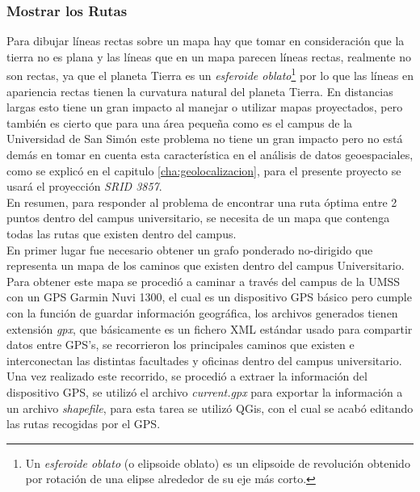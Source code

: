 \subsubsection{Mostrar los Rutas}
\label{sub:Mostrar los Rutas}

Para dibujar líneas rectas sobre un mapa hay que tomar en consideración que la tierra no es plana y las líneas que en un mapa parecen líneas rectas, realmente no son rectas, ya que el planeta Tierra es un \emph{esferoide oblato}\footnote{Un \emph{esferoide oblato} (o elipsoide oblato) es un elipsoide de revolución obtenido por rotación de una elipse alrededor de su eje más corto.} por lo que las líneas en apariencia rectas tienen la curvatura natural del planeta Tierra. En distancias largas esto tiene un gran impacto al manejar o utilizar mapas proyectados, pero también es cierto que para una área pequeña como es el campus de la Universidad de San Simón este problema no tiene un gran impacto pero no está demás en tomar en cuenta esta característica en el análisis de datos geoespaciales, como se explicó en el capitulo \ref{cha:geolocalizacion}, para el presente proyecto se usará el proyección \emph{SRID 3857}.\\



En resumen, para responder al problema de encontrar una ruta óptima entre 2 puntos dentro del campus universitario, se necesita de un mapa que contenga todas las rutas que existen dentro del campus.\\


 En primer lugar fue necesario obtener un grafo ponderado no-dirigido que representa un mapa de los caminos que existen dentro del campus Universitario.\\

 Para obtener este mapa se procedió a caminar a través del campus de la UMSS con un GPS Garmin Nuvi 1300, el cual es un dispositivo GPS básico pero cumple con la función de guardar información geográfica, los archivos generados tienen extensión \emph{gpx}, que básicamente es un fichero XML estándar usado para compartir datos entre GPS's, se recorrieron los principales caminos que existen e interconectan las distintas facultades y oficinas dentro del campus universitario. Una vez realizado este recorrido, se procedió a extraer la información del dispositivo GPS, se utilizó el archivo \emph{current.gpx} para exportar la información  a un archivo \emph{shapefile}, para esta tarea se utilizó QGis, con el cual se acabó editando las rutas recogidas por el GPS.\\

